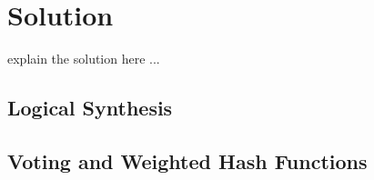 \section{Solution}
\label{sec:solution}

explain the solution here ...

\subsection{Logical Synthesis}

\subsection{Voting and Weighted Hash Functions}

